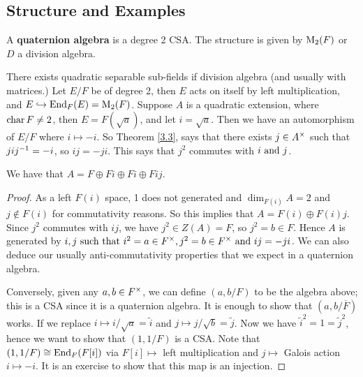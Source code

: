 \subsection{Structure and Examples}
\begin{defn}\label{3.11}
A \textbf{quaternion algebra} is a degree 2 CSA. The structure is given by $\operatorname{M}_2(F)$ or $D$ a division algebra. 
\end{defn}
There exists quadratic separable sub-fields if division algebra (and usually with matrices.) Let $E/F$ be of degree 2, then $E$ acts on itself by left multiplication, and $E \hookrightarrow \operatorname{End}_F(E) = \operatorname{M}_2(F)$. Suppose $A$ is a quadratic extension, where $\operatorname{char} F \neq 2$, then $E = F(\sqrt{a})$, and let $i = \sqrt{a}$. Then we have an automorphism of $E/F$ where $i \mapsto -i$. So Theorem \ref{3.3}, says that there exists $j \in A^{\times}$ such that $jij^{-1} = -i$, so $ij=-ji$. This says that $j^2$ commutes with $i \text{ and } j$.
\begin{lemma}\label{3.12}
We have that $A = F \oplus Fi \oplus Fi \oplus Fij.$
\end{lemma}
\begin{proof}
As a left $F(i)$ space, 1 does not generated and $\dim_{F(i)}A = 2$ and $j \notin F(i)$ for commutativity reasons. So this implies that $A = F(i) \oplus F(i)j$. Since $j^2$ commutes with $ij$, we have $j^2 \in Z(A) = F$, so $j^2 = b \in F$. Hence $A$ is generated by $i,j \text{ such that } i^2 = a \in F^{\times}, j^2 = b \in F^{\times} \text{ and } ij  = -ji$. We can also deduce our usually anti-commutativity properties that we expect in a quaternion algebra.

Conversely, given any $a,b \in F^{\times}$, we can define $(a,b/F)$ to be the algebra above; this is a CSA since it is a quaternion algebra. It is enough to show that $(a,b/\overline{F})$ works. If we replace $i \mapsto i/\sqrt{a} = \tilde{i}$ and $j \mapsto j/\sqrt{b} = \tilde{j}$. Now we have $\tilde{i}^2 = 1 = \tilde{j}^2$, hence we want to show that $(1,1/F)$ is a CSA. Note that 
$(1,1/F)\cong \operatorname{End}_F(F[i])$ via $F[i] \mapsto $ left multiplication and $j \mapsto$ Galois action $i \mapsto -i.$ It is an exercise to show that this map is an injection.
\end{proof}

